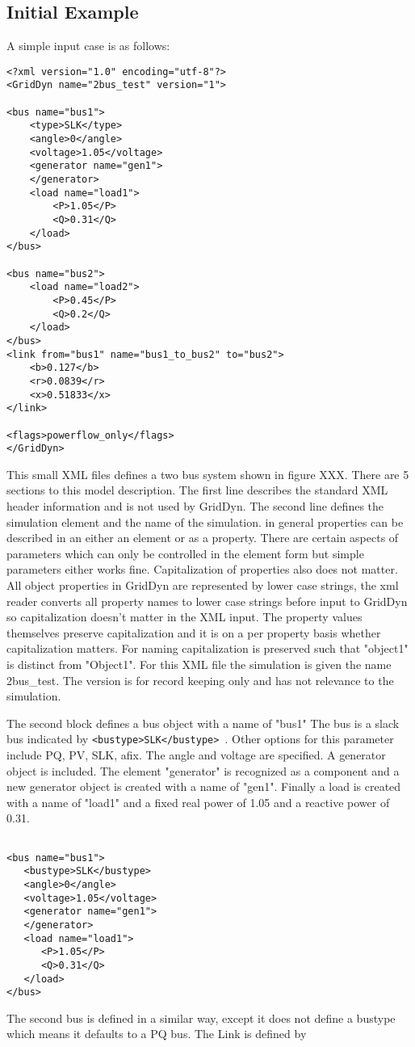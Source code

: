 \documentclass[12pt]{article} %
\begin{document}
\subsection{Initial Example}
A simple input case is as follows:
\begin{lstlisting}
<?xml version="1.0" encoding="utf-8"?>
<GridDyn name="2bus_test" version="1">

<bus name="bus1">
    <type>SLK</type>
    <angle>0</angle>
    <voltage>1.05</voltage>
    <generator name="gen1">
    </generator>
    <load name="load1">
        <P>1.05</P>
        <Q>0.31</Q>
    </load>
</bus>

<bus name="bus2">
    <load name="load2">
        <P>0.45</P>
        <Q>0.2</Q>
    </load>
</bus>
<link from="bus1" name="bus1_to_bus2" to="bus2">
    <b>0.127</b>
    <r>0.0839</r>
    <x>0.51833</x>
</link>

<flags>powerflow_only</flags>
</GridDyn>
\end{lstlisting}

This small XML files defines a two bus system shown in figure XXX.
There are 5 sections to this model description.  The first line describes the standard XML header information and is not used by GridDyn.  The second line defines the simulation element and the name of the simulation.  in general properties can be described in an either an element or as a property.  There are certain aspects of parameters which can only be controlled in the element form but simple parameters either works fine.  Capitalization of properties also does not matter.  All object properties in GridDyn are represented by lower case strings,  the xml reader converts all property names to lower case strings before input to GridDyn so capitalization doesn't matter in the XML input.  The property values themselves preserve capitalization and it is on a per property basis whether capitalization matters.  For naming capitalization is preserved such that "object1"  is distinct from "Object1".   For this XML file the simulation is given the name 2bus\_test.  The version is for record keeping only and has not relevance to the simulation.

The second block defines a bus object with a name of "bus1"  The bus is a slack bus indicated by {\tt <bustype>SLK</bustype> }.  Other options for this parameter include PQ, PV, SLK, afix.    The angle and voltage are specified.  A generator object is included.  The element "generator" is recognized as a component and a new generator object is created with a name of "gen1".  Finally a load is created with a name of "load1" and a fixed real power of 1.05 and a reactive power of 0.31.
\begin{lstlisting}

<bus name="bus1">
   <bustype>SLK</bustype>
   <angle>0</angle>
   <voltage>1.05</voltage>
   <generator name="gen1">
   </generator>
   <load name="load1">
      <P>1.05</P>
      <Q>0.31</Q>
   </load>
</bus>

\end{lstlisting}
The second bus is defined in a similar way, except it does not define a bustype which means it defaults to a PQ bus.
The Link is defined by
\end{document}

